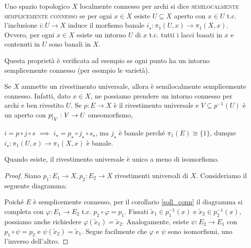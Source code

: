 \begin{defn}
  Uno spazio topologico $X$ localmente connesso per archi si dice \textsc{semilocalmente semplicemente connesso} se per ogni $x \in X$ esiste $U \subseteq X$ aperto con $x \in U$ t.c. l'inclusione $i:U \rightarrow X$ induce il morfismo banale $i_{\star}:\pi_1(U, x) \rightarrow \pi_1(X, x)$. Ovvero, per ogni $x \in X$ esiste un intorno $U$ di $x$ t.c. tutti i lacci basati in $x$ e contenuti in $U$ sono banali in $X$.
\end{defn}

Questa proprietà è verificata ad esempio se ogni punto ha un intorno semplicemente connesso (per esempio le varietà).

\begin{oss}
  Se $X$ ammette un rivestimento universale, allora è semilocalmente semplicemente connesso. Infatti, dato $x \in X$, ne possiamo prendere un intorno connesso per archi e ben rivestito $U$. Se $p:E \rightarrow X$ è il rivestimento universale e $V \subseteq p^{-1}(U)$ è un aperto con $p\restrict{V}:V \rightarrow U$ omeomorfismo,
  \begin{center}
  \end{center}
  $i=p \circ j \circ s$ $\implies$ $i_{\star}=p_{\star} \circ j_{\star} \circ s_{\star}$, ma $j_{\star}$ è banale perché $\pi_1(E) \cong \{1\}$, dunque $i_{\star}:\pi_1(U, x) \rightarrow \pi_1(X, x)$ è banale.
\end{oss}

\begin{lm}
  Quando esiste, il rivestimento universale è unico a meno di isomorfismo.
\end{lm}

\begin{proof}
  Siano $p_1:E_1 \rightarrow X, p_2:E_2 \rightarrow X$ rivestimenti universali di $X$. Consideriamo il seguente diagramma:
  \begin{center}
  \end{center}
  Poiché $E$ è semplicemente connesso, per il corollario \ref{soll_conn} il diagramma si completa con $\varphi:E_1 \rightarrow E_2$ t.c. $p_2 \circ \varphi=p_1$. Fissati $\tilde{x}_1 \in p_1^{-1}(x)$ e $\tilde{x}_2 \in p_2^{-1}(x)$, possiamo anche richiedere $\varphi(\tilde{x}_1)=\tilde{x}_2$.
  Analogamente, esiste $\psi:E_2 \rightarrow E_1$ con $p_1 \circ \psi=p_2$ e $\psi(\tilde{x}_2)=\tilde{x}_1$. Segue facilmente che $\varphi$ e $\psi$ sono isomorfismi, uno l'inverso dell'altro.
\end{proof}
